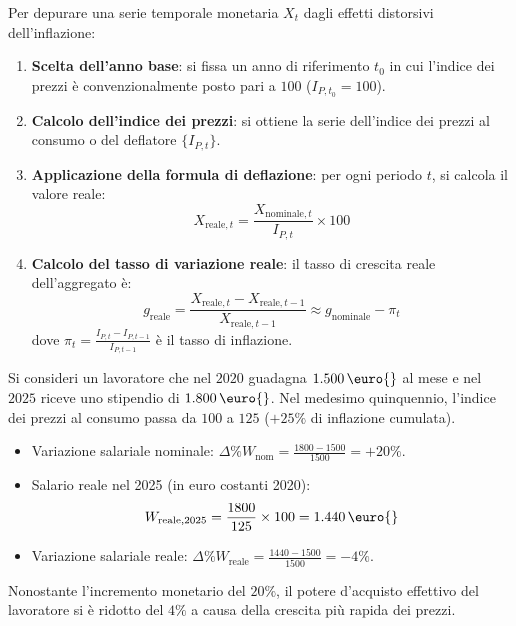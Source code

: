 \begin{metodo}
Per depurare una serie temporale monetaria $X_t$ dagli effetti distorsivi dell'inflazione:
\begin{enumerate}
    \item \textbf{Scelta dell'anno base}: si fissa un anno di riferimento $t_0$ in cui l'indice dei prezzi è convenzionalmente posto pari a $100$ ($I_{P, t_0} = 100$).
    \item \textbf{Calcolo dell'indice dei prezzi}: si ottiene la serie dell'indice dei prezzi al consumo o del deflatore $\{ I_{P, t} \}$.
    \item \textbf{Applicazione della formula di deflazione}: per ogni periodo $t$, si calcola il valore reale:
    \begin{equation}
        X_{\text{reale}, t} = \frac{X_{\text{nominale}, t}}{I_{P, t}} \times 100
    \end{equation}
    \item \textbf{Calcolo del tasso di variazione reale}: il tasso di crescita reale dell'aggregato è:
    \begin{equation}
        g_{\text{reale}} = \frac{X_{\text{reale}, t} - X_{\text{reale}, t-1}}{X_{\text{reale}, t-1}} \approx g_{\text{nominale}} - \pi_t
    \end{equation}
    dove $\pi_t = \frac{I_{P,t} - I_{P,t-1}}{I_{P,t-1}}$ è il tasso di inflazione.
\end{enumerate}
\end{metodo}

\begin{esempio}
Si consideri un lavoratore che nel $2020$ guadagna $1.500\,\text{\euro{}}$ al mese e nel $2025$ riceve uno stipendio di $1.800\,\text{\euro{}}$. Nel medesimo quinquennio, l'indice dei prezzi al consumo passa da $100$ a $125$ ($+25\%$ di inflazione cumulata).
\begin{itemize}
    \item Variazione salariale nominale: $\Delta\% W_{\text{nom}} = \frac{1800 - 1500}{1500} = +20\%$.
    \item Salario reale nel 2025 (in euro costanti 2020):
    \begin{equation}
        W_{\text{reale}, 2025} = \frac{1800}{125} \times 100 = 1.440\,\text{\euro{}}
    \end{equation}
    \item Variazione salariale reale: $\Delta\% W_{\text{reale}} = \frac{1440 - 1500}{1500} = -4\%$.
\end{itemize}
Nonostante l'incremento monetario del $20\%$, il potere d'acquisto effettivo del lavoratore si è ridotto del $4\%$ a causa della crescita più rapida dei prezzi.
\end{esempio}

